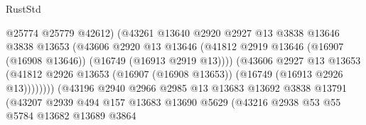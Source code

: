 \begin{lexlean}{RustStd}
\begin{coremodule}
                                          @25774
                                          @25779
                                          @42612)
                                        (@43261
                                          @13640
                                          @2920
                                          @2927
                                          @13
                                          @3838
                                          @13646
                                          @3838
                                          @13653
                                          (@43606
                                            @2920
                                            @13
                                            @13646
                                            (@41812
                                              @2919
                                              @13646
                                              (@16907 (@16908 @13646))
                                              (@16749 (@16913 @2919 @13))))
                                          (@43606
                                            @2927
                                            @13
                                            @13653
                                            (@41812
                                              @2926
                                              @13653
                                              (@16907 (@16908 @13653))
                                              (@16749 (@16913 @2926 @13))))))))
                                  (@43196
                                    @2940
                                    @2966
                                    @2985
                                    @13
                                    @13683
                                    @13692
                                    @3838
                                    @13791
                                    (@43207
                                      @2939
                                      @494
                                      @157
                                      @13683
                                      @13690
                                      @5629
                                      (@43216
                                        @2938
                                        @53
                                        @55
                                        @5784
                                        @13682
                                        @13689
                                        @3864

\end{coremodule}
\end{lexlean}
